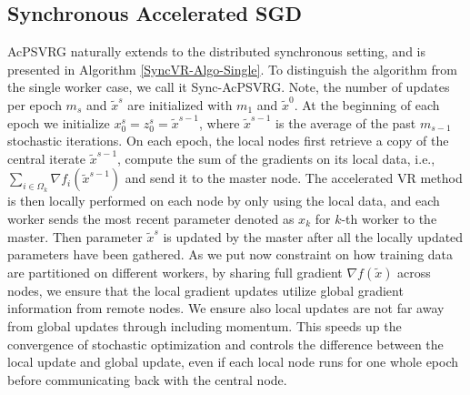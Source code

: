 \documentclass{article}
\theoremstyle{definition}
\theoremstyle{remark}
\begin{document}
\subsection{Synchronous Accelerated SGD}

AcPSVRG naturally extends to the distributed synchronous
setting,  and  is  presented  in  Algorithm  \ref{SyncVR-Algo-Single}.  To  distinguish  the
algorithm from the single worker case, we call it Sync-AcPSVRG. {Note, the number of updates per epoch $m_s$ and $\widetilde{x}^s$ are initialized with $m_1$ and $\widetilde{x}^0$. At the beginning of each epoch we initialize $x_0^s=z_0^s=\widetilde{x}^{s-1}$, where $\widetilde{x}^{s-1}$ is the average of the past $m_{s-1}$ stochastic iterations.} On  each  epoch,  the  local  nodes  first  retrieve  a  copy of  the  central  iterate $\widetilde{x}^{s-1}$, compute the sum of the gradients on its local data, i.e., $\sum_{i\in\Omega_k}{\nabla f_i{(\widetilde{x}^{s-1})}}$ and send it to the master node. The accelerated VR method is then locally performed on each node by only using the local data, and each worker sends the most recent parameter denoted as ${x}_k$ for $k$-th worker to the master. Then parameter $\widetilde{x}^s$ is updated by the master after all the locally updated parameters have been gathered. As we put now constraint on how training data are partitioned on different workers, by sharing full gradient $\nabla f(\widetilde{x})$ across nodes, we ensure  that  the  local  gradient  updates  utilize  global  gradient information from remote nodes. We ensure also local updates are not far away from global updates through including momentum. This speeds up the convergence of stochastic optimization and controls the difference between the local update and global update, even if each local  node  runs  for  one  whole  epoch  before  communicating back with the central node. 
\end{document}
